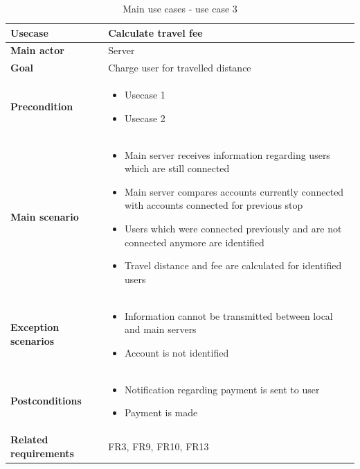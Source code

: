 \begin{table}[H]
	\centering
	\begin{tabularx}{\linewidth}{l|X}
		\textbf{Usecase}  &  Calculate travel fee\\ \hline
		\textbf{Main actor}  & Server\\ \hline
		\textbf{Goal}   &  Charge user for travelled distance\\ \hline
		\textbf{Precondition} & \begin{itemize}
			\item Usecase 1
			\item Usecase 2
		\end{itemize} \\ \hline
		\textbf{Main scenario}  & \begin{itemize}
			\item Main server receives information regarding users which are still connected
			\item Main server compares accounts currently connected with accounts connected for previous stop
			\item Users which were connected previously and are not connected anymore are identified
			\item Travel distance and fee are calculated for identified users
		\end{itemize} \\ \hline
		\textbf{Exception scenarios} & \begin{itemize}
			\item Information cannot be transmitted between local and main servers
			\item Account is not identified
		\end{itemize}\\ \hline
		\textbf{Postconditions} & \begin{itemize}
			\item Notification regarding payment is sent to user
			\item Payment is made
		\end{itemize}\\ \hline
		\textbf{Related requirements} & FR3, FR9, FR10, FR13\\ \hline
	\end{tabularx}
	\caption{Main use cases - use case 3}
	\label{tbl:uc3}
\end{table}
